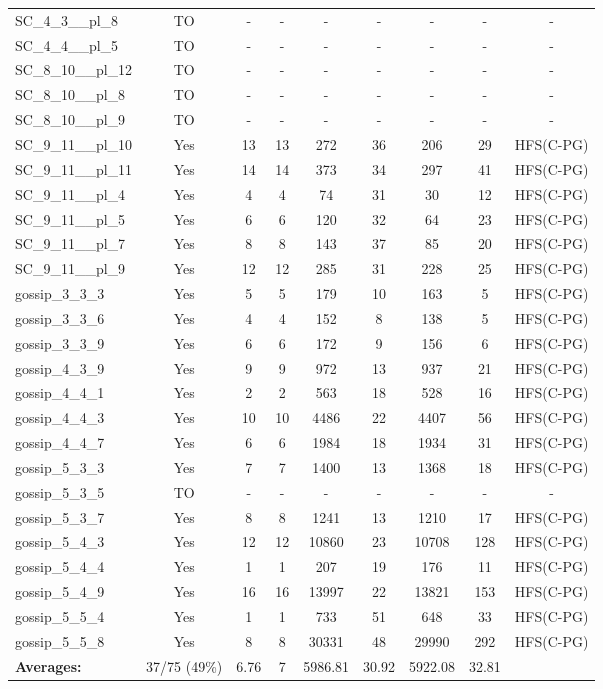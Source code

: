 \documentclass{article}
\begin{document}
\begin{tabular}{lcccccccc}
SC\_4\_3\_\_pl\_8 & TO & - & - & - & - & - & - & - \\
SC\_4\_4\_\_pl\_5 & TO & - & - & - & - & - & - & - \\
SC\_8\_10\_\_pl\_12 & TO & - & - & - & - & - & - & - \\
SC\_8\_10\_\_pl\_8 & TO & - & - & - & - & - & - & - \\
SC\_8\_10\_\_pl\_9 & TO & - & - & - & - & - & - & - \\
SC\_9\_11\_\_pl\_10 & Yes & 13 & 13 & 272 & 36 & 206 & 29 & HFS(C-PG) \\
SC\_9\_11\_\_pl\_11 & Yes & 14 & 14 & 373 & 34 & 297 & 41 & HFS(C-PG) \\
SC\_9\_11\_\_pl\_4 & Yes & 4 & 4 & 74 & 31 & 30 & 12 & HFS(C-PG) \\
SC\_9\_11\_\_pl\_5 & Yes & 6 & 6 & 120 & 32 & 64 & 23 & HFS(C-PG) \\
SC\_9\_11\_\_pl\_7 & Yes & 8 & 8 & 143 & 37 & 85 & 20 & HFS(C-PG) \\
SC\_9\_11\_\_pl\_9 & Yes & 12 & 12 & 285 & 31 & 228 & 25 & HFS(C-PG) \\
gossip\_3\_3\_3 & Yes & 5 & 5 & 179 & 10 & 163 & 5 & HFS(C-PG) \\
gossip\_3\_3\_6 & Yes & 4 & 4 & 152 & 8 & 138 & 5 & HFS(C-PG) \\
gossip\_3\_3\_9 & Yes & 6 & 6 & 172 & 9 & 156 & 6 & HFS(C-PG) \\
gossip\_4\_3\_9 & Yes & 9 & 9 & 972 & 13 & 937 & 21 & HFS(C-PG) \\
gossip\_4\_4\_1 & Yes & 2 & 2 & 563 & 18 & 528 & 16 & HFS(C-PG) \\
gossip\_4\_4\_3 & Yes & 10 & 10 & 4486 & 22 & 4407 & 56 & HFS(C-PG) \\
gossip\_4\_4\_7 & Yes & 6 & 6 & 1984 & 18 & 1934 & 31 & HFS(C-PG) \\
gossip\_5\_3\_3 & Yes & 7 & 7 & 1400 & 13 & 1368 & 18 & HFS(C-PG) \\
gossip\_5\_3\_5 & TO & - & - & - & - & - & - & - \\
gossip\_5\_3\_7 & Yes & 8 & 8 & 1241 & 13 & 1210 & 17 & HFS(C-PG) \\
gossip\_5\_4\_3 & Yes & 12 & 12 & 10860 & 23 & 10708 & 128 & HFS(C-PG) \\
gossip\_5\_4\_4 & Yes & 1 & 1 & 207 & 19 & 176 & 11 & HFS(C-PG) \\
gossip\_5\_4\_9 & Yes & 16 & 16 & 13997 & 22 & 13821 & 153 & HFS(C-PG) \\
gossip\_5\_5\_4 & Yes & 1 & 1 & 733 & 51 & 648 & 33 & HFS(C-PG) \\
gossip\_5\_5\_8 & Yes & 8 & 8 & 30331 & 48 & 29990 & 292 & HFS(C-PG) \\
\textbf{Averages:} & 37/75 (49\%) & 6.76 & 7 & 5986.81 & 30.92 & 5922.08 & 32.81 & \\
\bottomrule
\end{tabular}
\\[0.7cm]
\end{document}

